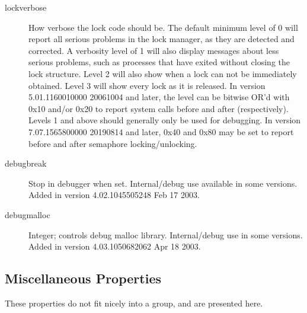 \begin{description}
\item[lockverbose] How verbose the lock code should be.  The default
minimum level of 0 will report all serious problems in the lock
manager, as they are detected and corrected.  A verbosity level of 1
will also display messages about less serious problems, such as
processes that have exited without closing the lock structure.  Level
2 will also show when a lock can not be immediately obtained.  Level 3
will show every lock as it is released.  In version 5.01.1160010000 20061004
and later, the level can be bitwise OR'd with 0x10 and/or 0x20
to report system calls before and after (respectively).  Levels 1 and
above should generally only be used for debugging.
In version 7.07.1565800000 20190814 and later, 0x40 and 0x80 may be
set to report before and after semaphore locking/unlocking.

\item[debugbreak] Stop in debugger when set.  Internal/debug use available
in some versions.  Added in version 4.02.1045505248 Feb 17 2003.

\item[debugmalloc] Integer; controls debug malloc library.  Internal/debug
use in some versions.  Added in version 4.03.1050682062 Apr 18 2003.

\end{description}

\subsection{Miscellaneous Properties}

These properties do not fit nicely into a group, and are presented here.

